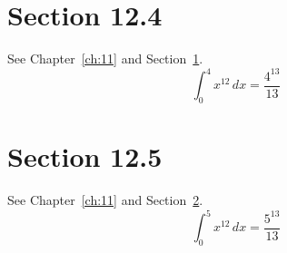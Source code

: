 \documentclass{book}
\begin{document}
\section{Section 12.4}\label{sec:12-4}
See Chapter~\ref{ch:11} and Section~\ref{sec:12-4}.
\lipsum[65-67]
\begin{equation}\label{eq:12-4} \int_0^{4} x^{12}\,dx = \frac{4^{13}}{13}\end{equation}
\section{Section 12.5}\label{sec:12-5}
See Chapter~\ref{ch:11} and Section~\ref{sec:12-5}.
\lipsum[66-68]
\begin{equation}\label{eq:12-5} \int_0^{5} x^{12}\,dx = \frac{5^{13}}{13}\end{equation}
\end{document}
